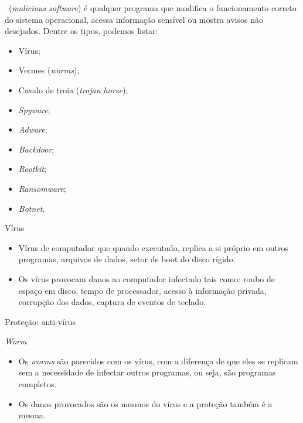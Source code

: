 \lecturetitle{\insertlecture}{\course}

\frame{\maketitle}

\begin{frame}{\insertlecture}\small
  
  \insertlecture\ ({\em malicious software}) é qualquer programa que modifica 
  o funcionamento correto do sistema operacional, acessa informação sensível ou 
  mostra avisos não desejados. \pause Dentre os tipos, podemos listar:

  \begin{itemize}
  \item Vírus;
  \item Vermes ({\em worms});
  \item Cavalo de troia ({\em trojan horse});
  \item {\em Spyware};
  \item {\em Adware};
  \item {\em Backdoor};
  \item {\em Rootkit};
  \item {\em Ransomware};
  \item {\em Botnet}.
  \end{itemize}
\end{frame}

\begin{frame}{Vírus}
\begin{itemize}[<+->]
\item Vírus de computador que quando executado, replica a si próprio
  em outros programas, arquivos de dados, setor de boot do disco
  rígido.
\item Os vírus provocam danos ao computador infectado tais como: roubo
  de espaço em disco, tempo de processador, acesso à informação
  privada, corrupção dos dados, captura de eventos de teclado.
\end{itemize}

\pause\bigskip
\alert{Proteção: anti-vírus}
\end{frame}

\begin{frame}{\em Worm}  

  \begin{itemize}[<+->]
    \item Os {\em worms} são parecidos com os vírus, com a diferença de que eles 
      se replicam sem a necessidade de infectar outros programas, ou seja, 
      são programas completos.
    \item Os danos provocados são os mesmos do vírus e a proteção também é a 
      mesma.
    \end{itemize}
\end{frame}

